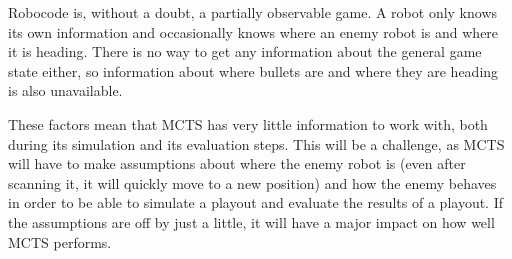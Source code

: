 Robocode is, without a doubt, a partially observable game. A robot only knows its own information and occasionally knows where an enemy robot is and where it is heading. There is no way to get any information about the general game state either, so information about where bullets are and where they are heading is also unavailable.

These factors mean that MCTS has very little information to work with, both during its simulation and its evaluation steps. This will be a challenge, as MCTS will have to make assumptions about where the enemy robot is (even after scanning it, it will quickly move to a new position) and how the enemy behaves in order to be able to simulate a playout and evaluate the results of a playout. If the assumptions are off by just a little, it will have a major impact on how well MCTS performs.